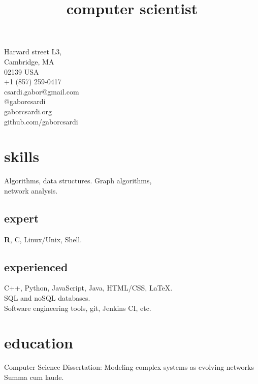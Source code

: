\documentclass[11pt]{moderncv}
\title{computer scientist\tikzmark{end}}
\begin{document}
\RaggedRight


\makecvtitle

\begin{aside}
 Harvard street L3,\\
Cambridge, MA\\
02139 USA\\[6pt]
+1 (857) 259-0417\\
csardi.gabor@gmail.com\\
@gaborcsardi\\
gaborcsardi.org\\
github.com/gaborcsardi

\section{skills}
Algorithms, data structures.
Graph algorithms,\\
network analysis.\\[6pt]
\subsection{expert}
\textcolor{color5}{\faHeart} 
\textbf{R}, C, Linux/Unix, Shell.\\[6pt]
\subsection{experienced}
C++, Python, JavaScript,
Java, HTML/CSS, \LaTeX.\\[6pt]
SQL and noSQL databases.\\[6pt]
Software engineering tools,
git, Jenkins CI, etc.
\end{aside}

\vspace*{1ex}

\section{education}

%
{Computer Science}%
{Dissertation: Modeling complex systems as evolving networks\\
Summa cum laude.}
\end{document}
